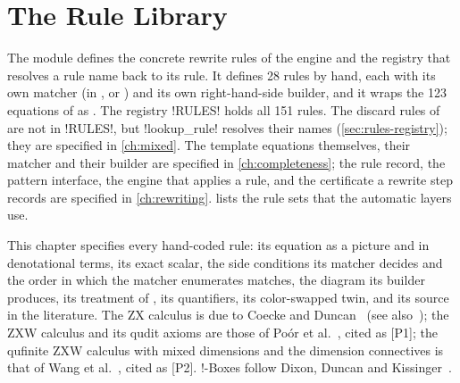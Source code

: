 \chapter{The Rule Library}\label{ch:rules}

\providecommand{\rulesup}[2]{%
  \draw[wire] (#1) -- ++(-0.3,0.75); \draw[wire] (#1) -- ++(0.3,0.75);
  \node[dimlabel] at ($(#1)+(0,0.62)$) {$\cdots$};
  \node[dimlabel,anchor=west] at ($(#1)+(0.32,0.72)$) {$#2$};}
\providecommand{\rulescn}[1]{\nolinkurl{#1}}
\providecommand{\rulesdown}[2]{%
  \draw[wire] (#1) -- ++(-0.3,-0.75); \draw[wire] (#1) -- ++(0.3,-0.75);
  \node[dimlabel] at ($(#1)+(0,-0.62)$) {$\cdots$};
  \node[dimlabel,anchor=west] at ($(#1)+(0.32,-0.72)$) {$#2$};}

The module  defines the concrete rewrite rules of the engine and the registry that resolves a rule name back to its rule. It defines 28 rules by hand, each with its own matcher (in ,  or ) and its own right-hand-side builder, and it wraps the 123 equations of  as . The registry \py!RULES! holds all 151 rules. The discard rules of  are not in \py!RULES!, but \py!lookup_rule! resolves their names (\cref{sec:rules-registry}); they are specified in \cref{ch:mixed}. The template equations themselves, their matcher and their builder are specified in \cref{ch:completeness}; the rule record, the pattern interface, the engine that applies a rule, and the certificate a rewrite step records are specified in \cref{ch:rewriting}.  lists the rule sets that the automatic layers use.

This chapter specifies every hand-coded rule: its equation as a picture and in denotational terms, its exact scalar, the side conditions its matcher decides and the order in which the matcher enumerates matches, the diagram its builder produces, its treatment of \bboxes{}, its quantifiers, its color-swapped twin, and its source in the literature. The ZX calculus is due to Coecke and Duncan~\cite{coecke2011interacting} (see also~\cite{vandewetering2020working}); the ZXW calculus and its qudit axioms are those of Po\'or et al.~\cite{poor2023zxw}, cited as [P1]; the qufinite ZXW calculus with mixed dimensions and the dimension connectives is that of Wang et al.~\cite{wang2023qufinitezxw,wang2021qufinite}, cited as [P2]. !-Boxes follow Dixon, Duncan and Kissinger~\cite{dixon2009graphical,kissinger2014pattern}.

